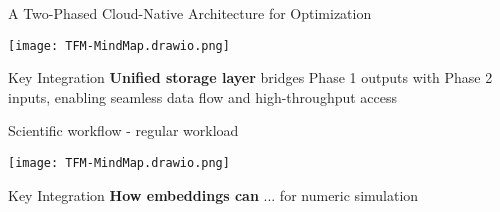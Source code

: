 \documentclass[aspectratio=169]{beamer}
\begin{document}
\begin{frame}{A Two-Phased Cloud-Native Architecture for Optimization}
    \begin{center}
        \texttt{[image: TFM-MindMap.drawio.png]}
    \end{center}
    
    \vspace{0.3cm}
    \begin{block}{Key Integration}
        \textbf{Unified storage layer} bridges Phase 1 outputs with Phase 2 inputs, enabling seamless data flow and high-throughput access
    \end{block}
\end{frame}

\begin{frame}{Scientific workflow - regular workload}
    \begin{center}
        \texttt{[image: TFM-MindMap.drawio.png]}
    \end{center}
    
    \vspace{0.3cm}
    \begin{block}{Key Integration}
        \textbf{How embeddings can} ... for numeric simulation \end{block}
\end{frame}
\end{document}
